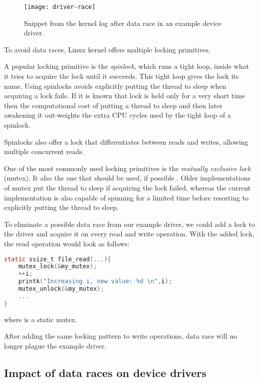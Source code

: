 \documentclass[..thesis.tex]{subfiles}
\begin{document}
\begin{figure}[H]
\centering
\texttt{[image: driver-race]}
\caption{Snippet from the kernel log after data race in an example device driver.}
\label{fig:driver-race}
\end{figure}



To avoid data races, Linux kernel offers multiple locking primitives. 

A popular locking primitive is the \textit{spinlock}, which runs a tight loop, inside what it tries to acquire the lock until it succeeds.
This tight loop gives the lock its name. Using spinlocks avoids explicitly putting the thread to sleep when acquiring a lock fails.
If it is known that lock is held only for a very short time then the computational cost of putting a thread to sleep and then later awakening
it out-weights the extra CPU cycles used by the tight loop of a spinlock.

Spinlocks also offer a lock that differentiates between reads and writes, allowing multiple concurrent reads.

One of the most commonly used locking primitives is the \textit{mutually exclusive lock} (mutex). It also the one that should be used, if possible
\cite[Documentation/locking/mutex-design.txt]{torvalds_linux}. Older implementations of mutex put the thread to sleep if acquiring the lock failed,
whereas the current implementation is also capable of spinning for a limited time before resorting to explicitly putting the thread to sleep.

To eliminate a possible data race from our example driver, we could add a lock to the driver and acquire it on every read and write operation.
With the added lock, the read operation would look as follows:

\begin{lstlisting}[language=C,style=def]
static ssize_t file_read(...){
    mutex_lock(&my_mutex);
    ++i;
    printk("Increasing i, new value: %d \n",i);
    mutex_unlock(&my_mutex);
    ...
}
\end{lstlisting}

where  is a static mutex.

After adding the same locking pattern to write operations, data race will no longer plague the example driver.

\subsection{Impact of data races on device drivers}
\end{document}
